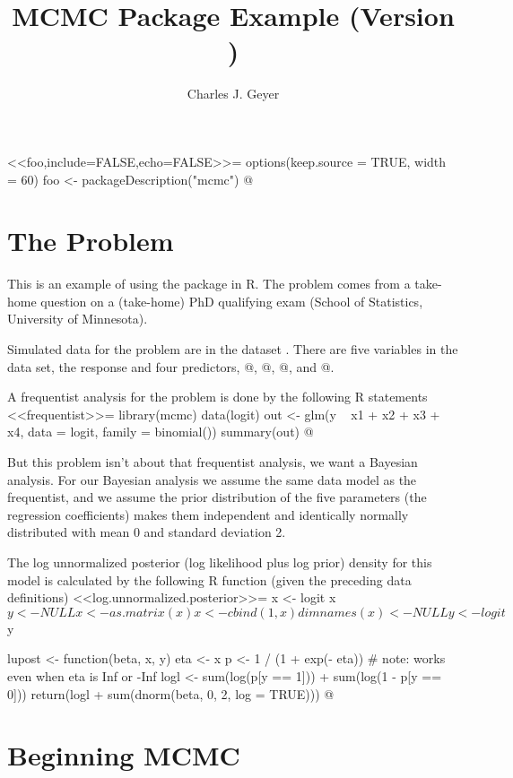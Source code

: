 \documentclass{article}
\begin{document}
	
	<<foo,include=FALSE,echo=FALSE>>=
	options(keep.source = TRUE, width = 60)
	foo <- packageDescription("mcmc")
	@
	
	\title{MCMC Package Example (Version )}
	\author{Charles J. Geyer}
	\maketitle
	
	\section{The Problem}
	
	This is an example of using the \verb@mcmc@ package in R.  The problem comes
	from a take-home question on a (take-home) PhD qualifying exam
	(School of Statistics, University of Minnesota).
	
	Simulated data for the problem are in the dataset \verb@logit@.
	There are five variables in the data set, the response \verb@y@
	and four predictors, @, @, @, and @.
	
	A frequentist analysis for the problem is done by the following R statements
	<<frequentist>>=
	library(mcmc)
	data(logit)
	out <- glm(y ~ x1 + x2 + x3 + x4, data = logit,
	family = binomial())
	summary(out)
	@
	
	But this problem isn't about that frequentist analysis, we want a Bayesian
	analysis.  For our Bayesian analysis we assume the same data model as the
	frequentist, and we assume the prior distribution of the five parameters
	(the regression coefficients) makes them independent and identically
	normally distributed with mean 0 and standard deviation 2.
	
	The log unnormalized posterior (log likelihood plus log prior) density
	for this model is calculated by
	the following R function (given the preceding data definitions)
	<<log.unnormalized.posterior>>=
	x <- logit
	x$y <- NULL
	x <- as.matrix(x)
	x <- cbind(1, x)
	dimnames(x) <- NULL
	
	y <- logit$y
	
	lupost <- function(beta, x, y) {
		eta <- x %
		p <- 1 / (1 + exp(- eta))   # note: works even when eta is Inf or -Inf
		logl <- sum(log(p[y == 1])) + sum(log(1 - p[y == 0]))
		return(logl + sum(dnorm(beta, 0, 2, log = TRUE)))
	}
	@
	
	\section{Beginning MCMC}
	
\end{document}
